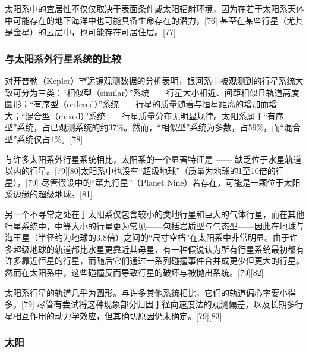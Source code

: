 太阳系中的宜居性不仅仅取决于表面条件或太阳辐射环境，因为在若干太阳系天体中可能存在的地下海洋中也可能具备生命存在的潜力，[76] 甚至在某些行星（尤其是金星）的云层中，也可能存在可居住层。[77]
\subsubsection{与太阳系外行星系统的比较}
对开普勒（Kepler）望远镜观测数据的分析表明，银河系中被观测到的行星系统大致可分为三类：“相似型（similar）”系统——行星大小相近、间距相似且轨道高度圆形；“有序型（ordered）”系统——行星的质量随着与恒星距离的增加而增大；“混合型（mixed）”系统——行星质量分布无明显规律。太阳系属于“有序型”系统，占已观测系统的约37\%。然而，“相似型”系统为多数，占59\%，而“混合型”系统仅占4\%。[78]

与许多太阳系外行星系统相比，太阳系的一个显著特征是 —— 缺乏位于水星轨道以内的行星。[79][80]太阳系中也没有“超级地球”（质量为地球的1至10倍的行星），[79] 尽管假设中的“第九行星”（Planet Nine）若存在，可能是一颗位于太阳系边缘的超级地球。[81]

另一个不寻常之处在于太阳系仅包含较小的类地行星和巨大的气体行星，而在其他行星系统中，中等大小的行星更为常见——包括岩质型与气态型——因此在地球与海王星（半径约为地球的3.8倍）之间的“尺寸空档”在太阳系中非常明显。由于许多超级地球的轨道都比水星更靠近其母星，有一种假说认为所有行星系统最初都有许多靠近恒星的行星，而随后它们通过一系列碰撞事件合并成更少但更大的行星。然而在太阳系中，这些碰撞反而导致行星的破坏与被抛出系统。[79][82]

太阳系行星的轨道几乎为圆形。与许多其他系统相比，它们的轨道偏心率要小得多。[79] 尽管有尝试将这种现象部分归因于径向速度法的观测偏差，以及长期多行星相互作用的动力学效应，但其确切原因仍未确定。[79][83]
\subsubsection{太阳}



